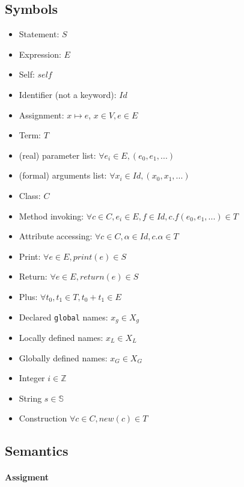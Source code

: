\documentclass[]{article}
\numberwithin{equation}{section}
\numberwithin{figure}{section}
\numberwithin{table}{section}
\begin{document}
\subsection{Symbols}\label{symbols}

\begin{itemize}
\itemsep1pt\parskip0pt
\item
  Statement: $S$
\item
  Expression: $E$
\item
  Self: $self$
\item
  Identifier (not a keyword): $Id$
\item
  Assignment: $x \mapsto e$, $x \in V, e \in E$
\item
  Term: $T$
\item
  (real) parameter list: $\forall e_i \in E, (e_0, e_1, ...)$
\item
  (formal) arguments list: $\forall x_i \in Id, (x_0, x_1, ...)$
\item
  Class: $C$
\item
  Method invoking:
  $\forall c \in C, e_i \in E, f \in Id, c.f(e_0, e_1, ...) \in T$
\item
  Attribute accessing: $\forall c \in C, \alpha \in Id, c.\alpha \in T$
\item
  Print: $\forall e \in E, print(e) \in S$
\item
  Return: $\forall e \in E, return(e) \in S$
\item
  Plus: $\forall t_0, t_1 \in T, t_0 + t_1 \in E$
\item
  Declared \texttt{global} names: $x_g \in X_g$
\item
  Locally defined names: $x_L \in X_L$
\item
  Globally defined names: $x_G \in X_G$
\item
  Integer $i \in \mathbb Z$
\item
  String $s \in \mathbb S$
\item
  Construction $\forall c \in C, new(c) \in T$
\end{itemize}

\subsection{Semantics}\label{semantics}

\paragraph{Assigment}\label{assigment}
\end{document}
